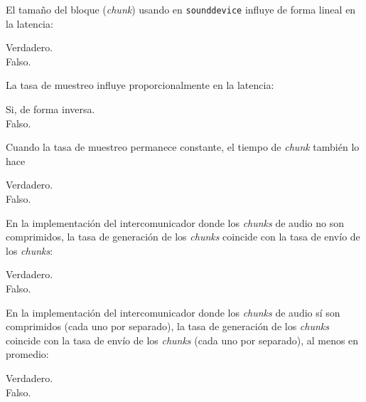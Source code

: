 \documentclass[legalpaper, 12pt, addpoints]{exam}
\begin{document}
\begin{questions}
\vspace{0.10in}

\question El tamaño del bloque (\emph{chunk}) usando en \texttt{sounddevice}
influye de forma lineal en la latencia:

\begin{oneparchoices}
  \choice Verdadero.\\
  \choice Falso.
\end{oneparchoices}
  
\vspace{0.10in}

\question La tasa de muestreo influye proporcionalmente en la latencia:

\begin{oneparchoices}
  \choice Si, de forma inversa.\\
  \choice Falso.
\end{oneparchoices}
  
\vspace{0.10in}

\question Cuando la tasa de muestreo permanece constante, el tiempo de \emph{chunk} también lo hace

\begin{oneparchoices}
  \choice Verdadero.\\
  \choice Falso.
\end{oneparchoices}
  
\vspace{0.10in}

\question En la implementación del intercomunicador donde los \emph{chunks}
de audio no son comprimidos, la tasa de generación de los \emph{chunks}
coincide con la tasa de envío de los \emph{chunks}:

\begin{oneparchoices}
  \choice Verdadero.\\
  \choice Falso.
\end{oneparchoices}
  
\vspace{0.10in}

\question En la implementación del intercomunicador donde los
\emph{chunks} de audio sí son comprimidos (cada uno por separado), la
tasa de generación de los \emph{chunks} coincide con la tasa de envío
de los \emph{chunks} (cada uno por separado), al menos en promedio:

\begin{oneparchoices}
  \choice Verdadero.\\
  \choice Falso.
\end{oneparchoices}
  

\end{questions}
\end{document}
